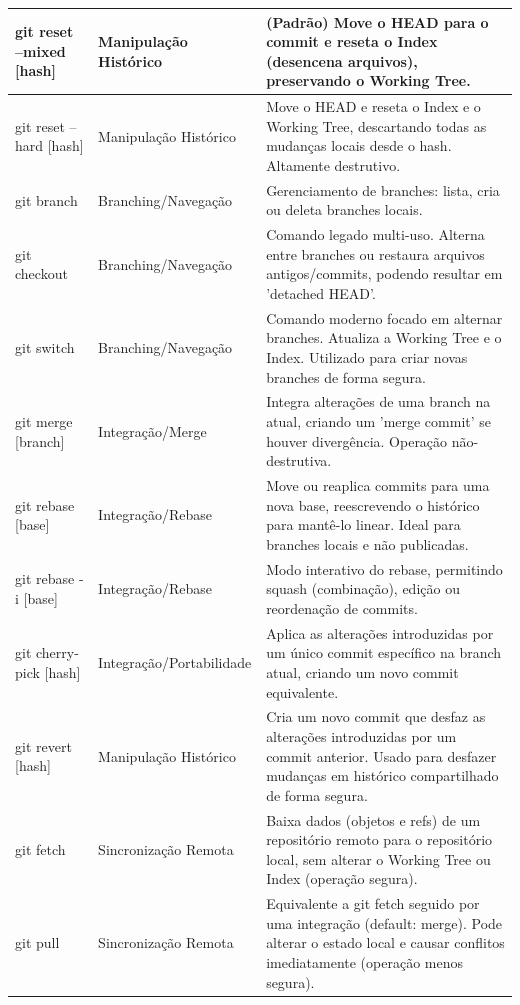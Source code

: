 \begin{longtable}{|p{3cm}|p{4cm}|p{7cm}|}
    \hline
    git reset --mixed [hash] & Manipulação Histórico & (Padrão) Move o HEAD para o commit e reseta o Index (desencena arquivos), preservando o Working Tree. \\
    \hline
    git reset --hard [hash] & Manipulação Histórico & Move o HEAD e reseta o Index e o Working Tree, descartando todas as mudanças locais desde o hash. Altamente destrutivo. \\
    \hline
    git branch & Branching/Navegação & Gerenciamento de branches: lista, cria ou deleta branches locais. \\
    \hline
    git checkout & Branching/Navegação & Comando legado multi-uso. Alterna entre branches ou restaura arquivos antigos/commits, podendo resultar em 'detached HEAD'. \\
    \hline
    git switch & Branching/Navegação & Comando moderno focado em alternar branches. Atualiza a Working Tree e o Index. Utilizado para criar novas branches de forma segura. \\
    \hline
    git merge [branch] & Integração/Merge & Integra alterações de uma branch na atual, criando um 'merge commit' se houver divergência. Operação não-destrutiva. \\
    \hline
    git rebase [base] & Integração/Rebase & Move ou reaplica commits para uma nova base, reescrevendo o histórico para mantê-lo linear. Ideal para branches locais e não publicadas. \\
    \hline
    git rebase -i [base] & Integração/Rebase & Modo interativo do rebase, permitindo squash (combinação), edição ou reordenação de commits. \\
    \hline
    git cherry-pick [hash] & Integração/Portabilidade & Aplica as alterações introduzidas por um único commit específico na branch atual, criando um novo commit equivalente. \\
    \hline
    git revert [hash] & Manipulação Histórico & Cria um novo commit que desfaz as alterações introduzidas por um commit anterior. Usado para desfazer mudanças em histórico compartilhado de forma segura. \\
    \hline
    git fetch & Sincronização Remota & Baixa dados (objetos e refs) de um repositório remoto para o repositório local, sem alterar o Working Tree ou Index (operação segura). \\
    \hline
    git pull & Sincronização Remota & Equivalente a git fetch seguido por uma integração (default: merge). Pode alterar o estado local e causar conflitos imediatamente (operação menos segura). \\

\end{longtable}
